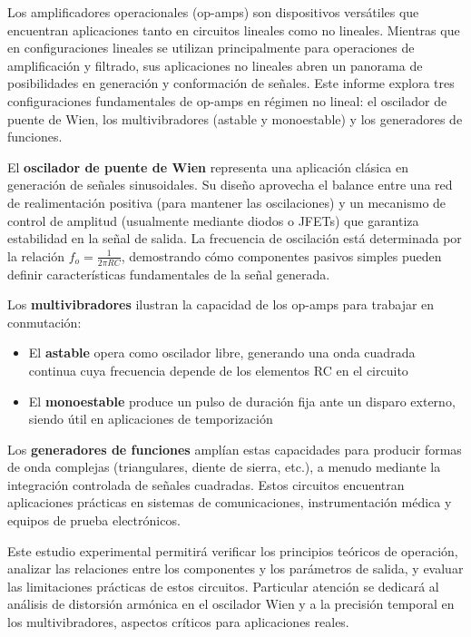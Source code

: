Los amplificadores operacionales (op-amps) son dispositivos versátiles que encuentran aplicaciones tanto en circuitos lineales como no lineales. Mientras que en configuraciones lineales se utilizan principalmente para operaciones de amplificación y filtrado, sus aplicaciones no lineales abren un panorama de posibilidades en generación y conformación de señales. Este informe explora tres configuraciones fundamentales de op-amps en régimen no lineal: el oscilador de puente de Wien, los multivibradores (astable y monoestable) y los generadores de funciones.

El \textbf{oscilador de puente de Wien} representa una aplicación clásica en generación de señales sinusoidales. Su diseño aprovecha el balance entre una red de realimentación positiva (para mantener las oscilaciones) y un mecanismo de control de amplitud (usualmente mediante diodos o JFETs) que garantiza estabilidad en la señal de salida. La frecuencia de oscilación está determinada por la relación $f_o = \frac{1}{2\pi RC}$, demostrando cómo componentes pasivos simples pueden definir características fundamentales de la señal generada.

Los \textbf{multivibradores} ilustran la capacidad de los op-amps para trabajar en conmutación:
\begin{itemize}
    \item El \textbf{astable} opera como oscilador libre, generando una onda cuadrada continua cuya frecuencia depende de los elementos RC en el circuito
    \item El \textbf{monoestable} produce un pulso de duración fija ante un disparo externo, siendo útil en aplicaciones de temporización
\end{itemize}

Los \textbf{generadores de funciones} amplían estas capacidades para producir formas de onda complejas (triangulares, diente de sierra, etc.), a menudo mediante la integración controlada de señales cuadradas. Estos circuitos encuentran aplicaciones prácticas en sistemas de comunicaciones, instrumentación médica y equipos de prueba electrónicos.

Este estudio experimental permitirá verificar los principios teóricos de operación, analizar las relaciones entre los componentes y los parámetros de salida, y evaluar las limitaciones prácticas de estos circuitos. Particular atención se dedicará al análisis de distorsión armónica en el oscilador Wien y a la precisión temporal en los multivibradores, aspectos críticos para aplicaciones reales.

